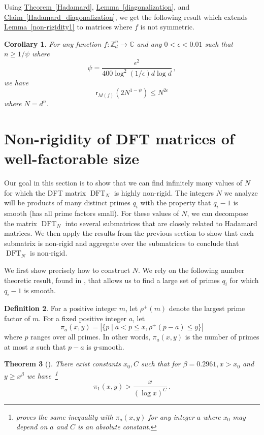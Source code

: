 \documentclass[11pt]{article}
\numberwithin{equation}{section}
\newtheorem{theorem}{Theorem}[section]
\newtheorem{corollary}[theorem]{Corollary}
\theoremstyle{definition}
\theoremstyle{plain}
\newcommand{\C}{\mathbb C}
\newcommand{\Z}{\mathbb Z}
\newcommand{\expref}[2]{\hyperref[#2]{#1~\ref{#2}}}
\theoremstyle{definition}
\newtheorem{define}[theorem]{Definition}
\renewcommand\Z{{\mathbb{Z}}}
\renewcommand\C{{\mathbb{C}}}
\DeclareMathOperator{\DFT}{DFT}
\begin{document}
Using \expref{Theorem}{Hadamard}, \expref{Lemma}{diagonalization}, and \expref{Claim}{Hadamard_diagonalization}, we get the following result which extends \expref{Lemma}{non-rigidity1} to matrices where $f$ is not symmetric.
\begin{corollary}\label{groupalgebra1}
For any function $f: \Z_d^n \rightarrow \C$ and any $0 < \epsilon < 0.01$ such that $n \geq 1/ \psi$ where 
\[\psi = \frac{\epsilon^2 }{400\log^2 (1/\epsilon) d \log d} \,,\]
 we have 
\[
\textsf{r}_{M(f)}\left(2N^{1 - \psi}\right) \leq N^{ 2\epsilon}
\]
where $N = d^n$.
\end{corollary}

\section{Non-rigidity of  %
DFT matrices of well-factorable size} %
\label{sec_Fourier1}
Our goal in this section is to show that we can find infinitely many values of $N$ for which the %
DFT %
 matrix %
$\DFT_N$ %
 is highly non-rigid.  The integers $N$ we analyze will be products of many distinct primes $q_i$ with the property that $q_i - 1$ is
%
smooth (has all prime factors small).  For these values of $N$, we can decompose the matrix %
$\DFT_N$ %
 into several submatrices that are closely related to Hadamard matrices.  We then apply the results from the previous section to show that each submatrix is non-rigid and aggregate over the submatrices to conclude that %
$\DFT_N$ %
 is non-rigid.

We first show precisely how to construct $N$.  We rely on the following number theoretic result, found in \cite{smooth_primes}, that allows us to find a large set of primes $q_i$ for which $q_i - 1$ is %
%
smooth. 
\begin{define}
For a positive integer $m$, let $\rho^+(m)$ denote the largest prime factor of $m$.  For a fixed positive integer $a$, let
%
%
%
%
$$
\pi_a(x,y) = |\{p \mid a<p \leq x, \rho^+(p-a) \leq y\} |
$$
%
where $p$ ranges over all primes.  In other words, $\pi_a(x,y)$ is the number of primes at most $x$ such that $p-a$ is $y$-smooth.
\end{define}
\begin{theorem}[\hspace{1sp}\cite{smooth_primes}]\label{analytic_NT}
There exist constants $x_0,C$ such that for $\beta = 0.2961, x > x_0$ and $y \geq x^{\beta}$ we have~\footnote{\cite{smooth_primes} proves the same inequality with $\pi_a(x,y)$ for any integer $a$ where $x_0$ may depend on $a$ and $C$ is an absolute constant.}
$$
\pi_1(x,y) > \frac{x}{(\log x)^C}\,.
$$

\end{theorem}
\end{document}
